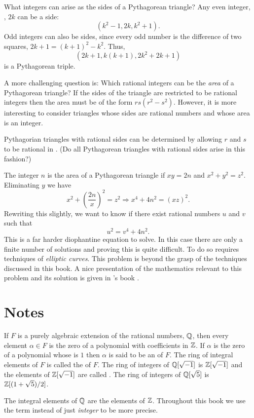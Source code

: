 What integers can arise as the sides of a Pythagorean triangle?  Any
even integer, \eg, $2k$ can be a side:
\[
(k^2 - 1 , 2k, k^2+1).
\]
Odd integers can also be sides, since every odd number is the difference
of two squares, $2k+1 = (k+1)^2 - k^2$.  Thus,
\[
(2k+1, k(k+1), 2k^2+2k +1)
\]
is a Pythagorean triple.

A more challenging question is: Which rational integers can be the
{\em area} of a Pythagorean triangle?  If the sides of the triangle
are restricted to be rational integers then the area must be of the
form $rs(r^2-s^2)$.  However, it is more interesting to consider
triangles whose sides are rational numbers and whose area is an
integer.

Pythagorian triangles with rational sides can be determined by
allowing $r$ and $s$ to be rational in .  (Do
all Pythagorean triangles with rational sides arise in this fashion?)

The integer $n$ is the area of a Pythagorean triangle if $xy = 2n$ and
$x^2 +y^2 = z^2$.  Eliminating $y$ we have
\[
x^2 + \left(\frac{2n}{x}\right)^2 = z^2 \Longrightarrow x^4 + 4n^2 =
(xz)^2.
\]
Rewriting this slightly, we want to know if there exist rational
numbers $u$ and $v$ such that
\begin{equation}\label{Euclid:Cong:Eq}
u^2 = v^4 + 4n^2.
\end{equation}
This is a far harder diophantine equation to solve.  In this case
there are only a finite number of solutions and proving this is quite
difficult.  To do so requires techniques of {\em elliptic
curves}. This problem is beyond the grasp of the
techniques discussed in this book.  A nice presentation of the
mathematics relevant to this problem and its solution is given in
{\Koblitz}'s book \cite{Koblitz2012-wq}.

\section*{Notes}

\small

If $F$ is a purely algebraic extension of the rational numbers, $\mathbb{Q}$,
then every element $\alpha \in F$ is the zero of a polynomial with
coefficients in $\mathbb{Z}$.  If $\alpha$ is the zero of a polynomial whose
 is $1$ then $\alpha$ is said to be an
 of $F$.  The ring of integral elements of $F$
is called the  of $F$.  The ring of integers of
$\mathbb{Q}[\sqrt{-1}]$ is $\mathbb{Z}[\sqrt{-1}]$ and the elements of $\mathbb{Z}[\sqrt{-1}]$
are called .  The ring of integers of
$\mathbb{Q}[\sqrt{5}]$ is $\mathbb{Z}[(1+\sqrt{5})/2]$.

The integral elements of $\mathbb{Q}$ are the elements of $\mathbb{Z}$.  Throughout
this book we use the term  instead of just {\em
integer} to be more precise.

\normalsize
